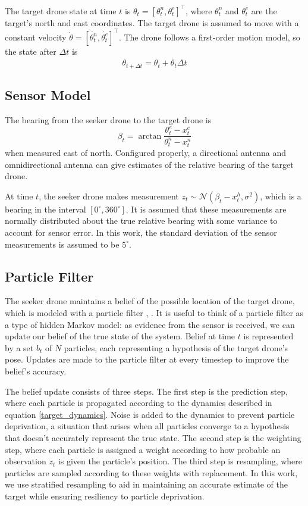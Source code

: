 \documentclass[10pt,twocolumn,letterpaper]{article}
\begin{document}
The target drone state at time $t$ is $\theta_t = [\theta_t^n, \theta_t^e]^\intercal$, where $\theta_t^n$ and $\theta_t^e$ are the target's north and east coordinates.
The target drone is assumed to move with a constant velocity $\dot{\theta} = [\dot{\theta_t^n}, \dot{\theta_t^e}]^\intercal$.
The drone follows a first-order motion model, so the state after $\Delta t$ is
\begin{equation}
\theta_{t + \Delta t} = \theta_t + \dot{\theta_t}\Delta t
\label{target_dynamics}
\end{equation}

\subsection{Sensor Model}
The bearing from the seeker drone to the target drone is 
\begin{equation}
\beta_t = \arctan{\frac{\theta_t^e - x_t^e}{\theta_t^n - x_t^n}}
\end{equation}
when measured east of north.
Configured properly, a directional antenna and omnidirectional antenna can give estimates of the relative bearing of the target drone.
 \cite{sensor_modality}

At time $t$, the seeker drone makes measurement $z_t \sim \mathcal{N}(\beta_t - x_t^h, \sigma^2)$, which is a bearing in the interval $[0^{\circ}, 360^{\circ}]$.
It is assumed that these measurements are normally distributed about the true relative bearing with some variance to account for sensor error.
In this work, the standard deviation of the sensor measurements is assumed to be $5^{\circ}$.

\subsection{Particle Filter}
The seeker drone maintains a belief of the possible location of the target drone, which is modeled with a particle filter \cite{decision_making}, \cite{prob_rob}.
It is useful to think of a particle filter as a type of hidden Markov model: as evidence from the sensor is received, we can update our belief of the true state of the system.
Belief at time $t$ is represented by a set $b_t$ of $N$ particles, each representing a hypothesis of the target drone's pose.
Updates are made to the particle filter at every timestep to improve the belief's accuracy.

The belief update consists of three steps. 
The first step is the prediction step, where each particle is propagated according to the dynamics described in equation \ref{target_dynamics}.
Noise is added to the dynamics to prevent particle deprivation, a situation that arises when all particles converge to a hypothesis that doesn't accurately represent the true state.
The second step is the weighting step, where each particle is assigned a weight according to how probable an observation $z_t$ is given the particle's position.
The third step is resampling, where particles are sampled according to these weights with replacement.
In this work, we use stratified resampling to aid in maintaining an accurate estimate of the target while ensuring resiliency to particle deprivation.
\end{document}
